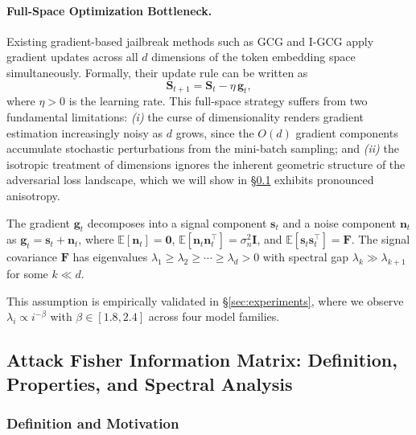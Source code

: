 \documentclass[preprint,12pt]{elsarticle}
\begin{document}
\paragraph{Full-Space Optimization Bottleneck.} Existing gradient-based jailbreak methods such as GCG \cite{zou2023universal} and I-GCG \cite{jia2024improved} apply gradient updates across all $d$ dimensions of the token embedding space simultaneously. Formally, their update rule can be written as
\begin{equation}
\label{eq:full_space_update}
\mathbf{S}_{t+1} = \mathbf{S}_t - \eta \, \mathbf{g}_t,
\end{equation}
where $\eta > 0$ is the learning rate. This full-space strategy suffers from two fundamental limitations: \textit{(i)} the curse of dimensionality renders gradient estimation increasingly noisy as $d$ grows, since the $O(d)$ gradient components accumulate stochastic perturbations from the mini-batch sampling; and \textit{(ii)} the isotropic treatment of dimensions ignores the inherent geometric structure of the adversarial loss landscape, which we will show in \S\ref{sec:afim} exhibits pronounced anisotropy.

\begin{assumption}
\label{ass:anisotropic_noise}
The gradient $\mathbf{g}_t$ decomposes into a signal component $\mathbf{s}_t$ and a noise component $\mathbf{n}_t$ as $\mathbf{g}_t = \mathbf{s}_t + \mathbf{n}_t$, where $\mathbb{E}[\mathbf{n}_t] = \mathbf{0}$, $\mathbb{E}[\mathbf{n}_t \mathbf{n}_t^\top] = \sigma_n^2 \mathbf{I}$, and $\mathbb{E}[\mathbf{s}_t \mathbf{s}_t^\top] = \mathbf{F}$. The signal covariance $\mathbf{F}$ has eigenvalues $\lambda_1 \geq \lambda_2 \geq \cdots \geq \lambda_d > 0$ with spectral gap $\lambda_k \gg \lambda_{k+1}$ for some $k \ll d$.
\end{assumption}

This assumption is empirically validated in \S\ref{sec:experiments}, where we observe $\lambda_i \propto i^{-\beta}$ with $\beta \in [1.8, 2.4]$ across four model families.

\subsection{Attack Fisher Information Matrix: Definition, Properties, and Spectral Analysis}
\label{sec:afim}

\subsubsection{Definition and Motivation}
\end{document}
